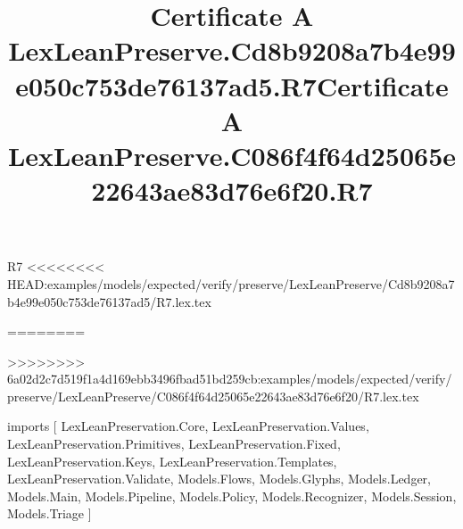 \begin{lexlean}{R7}
<<<<<<<< HEAD:examples/models/expected/verify/preserve/LexLeanPreserve/Cd8b9208a7b4e99e050c753de76137ad5/R7.lex.tex
\title{Certificate A LexLeanPreserve.Cd8b9208a7b4e99e050c753de76137ad5.R7}
========
\title{Certificate A LexLeanPreserve.C086f4f64d25065e22643ae83d76e6f20.R7}
>>>>>>>> 6a02d2c7d519f1a4d169ebb3496fbad51bd259cb:examples/models/expected/verify/preserve/LexLeanPreserve/C086f4f64d25065e22643ae83d76e6f20/R7.lex.tex
\begin{coremodule}
imports [
  LexLeanPreservation.Core,
  LexLeanPreservation.Values,
  LexLeanPreservation.Primitives,
  LexLeanPreservation.Fixed,
  LexLeanPreservation.Keys,
  LexLeanPreservation.Templates,
  LexLeanPreservation.Validate,
  Models.Flows,
  Models.Glyphs,
  Models.Ledger,
  Models.Main,
  Models.Pipeline,
  Models.Policy,
  Models.Recognizer,
  Models.Session,
  Models.Triage
]


\end{coremodule}
\end{lexlean}
